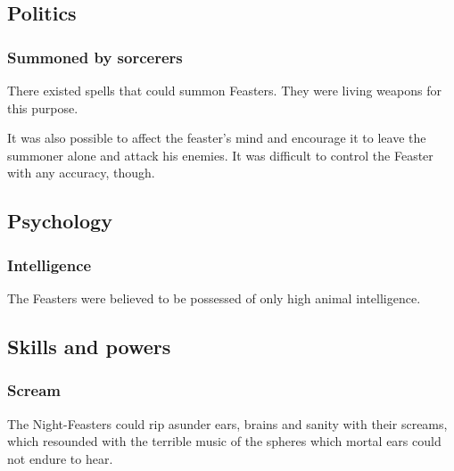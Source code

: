 \subsection{Politics}





\subsubsection{Summoned by sorcerers}
There existed spells that could summon Feasters. 
They were living weapons  for this purpose. 

It was also possible to affect the feaster's mind and encourage it to leave the summoner alone and attack his enemies. 
It was difficult to control the Feaster with any accuracy, though. 









\subsection{Psychology}





\subsubsection{Intelligence}
The Feasters were believed to be possessed of only high animal intelligence. 









\subsection{Skills and powers}





\subsubsection{Scream}
The Night-Feasters could rip asunder ears, brains and sanity with their screams, which resounded with the terrible music of the spheres which mortal ears could not endure to hear. 















